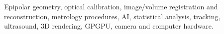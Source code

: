 




Epipolar geometry, optical calibration, image/volume registration and reconstruction, metrology procedures, AI, statistical analysis, tracking, ultrasound, 3D rendering, GPGPU, camera and computer hardware.


